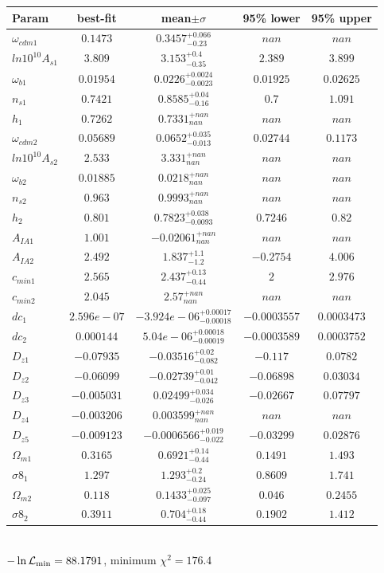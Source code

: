 \begin{tabular}{|l|c|c|c|c|} 
 \hline 
Param & best-fit & mean$\pm\sigma$ & 95\% lower & 95\% upper \\ \hline 
$\omega_{cdm 1 }$ &$0.1473$ & $0.3457_{-0.23}^{+0.066}$ & $nan$ & $nan$ \\ 
$ln10^{10}A_{s 1 }$ &$3.809$ & $3.153_{-0.35}^{+0.4}$ & $2.389$ & $3.899$ \\ 
$\omega_{b 1 }$ &$0.01954$ & $0.0226_{-0.0023}^{+0.0024}$ & $0.01925$ & $0.02625$ \\ 
$n_{s 1 }$ &$0.7421$ & $0.8585_{-0.16}^{+0.04}$ & $0.7$ & $1.091$ \\ 
$h_{1 }$ &$0.7262$ & $0.7331_{nan}^{+nan}$ & $nan$ & $nan$ \\ 
$\omega_{cdm 2 }$ &$0.05689$ & $0.0652_{-0.013}^{+0.035}$ & $0.02744$ & $0.1173$ \\ 
$ln10^{10}A_{s 2 }$ &$2.533$ & $3.331_{nan}^{+nan}$ & $nan$ & $nan$ \\ 
$\omega_{b 2 }$ &$0.01885$ & $0.0218_{nan}^{+nan}$ & $nan$ & $nan$ \\ 
$n_{s 2 }$ &$0.963$ & $0.9993_{nan}^{+nan}$ & $nan$ & $nan$ \\ 
$h_{2 }$ &$0.801$ & $0.7823_{-0.0093}^{+0.038}$ & $0.7246$ & $0.82$ \\ 
$A_{IA 1 }$ &$1.001$ & $-0.02061_{nan}^{+nan}$ & $nan$ & $nan$ \\ 
$A_{IA 2 }$ &$2.492$ & $1.837_{-1.2}^{+1.1}$ & $-0.2754$ & $4.006$ \\ 
$c_{min 1 }$ &$2.565$ & $2.437_{-0.44}^{+0.13}$ & $2$ & $2.976$ \\ 
$c_{min 2 }$ &$2.045$ & $2.57_{nan}^{+nan}$ & $nan$ & $nan$ \\ 
$dc_{1 }$ &$2.596e-07$ & $-3.924e-06_{-0.00018}^{+0.00017}$ & $-0.0003557$ & $0.0003473$ \\ 
$dc_{2 }$ &$0.000144$ & $5.04e-06_{-0.00019}^{+0.00018}$ & $-0.0003589$ & $0.0003752$ \\ 
$D_{z1 }$ &$-0.07935$ & $-0.03516_{-0.082}^{+0.02}$ & $-0.117$ & $0.0782$ \\ 
$D_{z2 }$ &$-0.06099$ & $-0.02739_{-0.042}^{+0.01}$ & $-0.06898$ & $0.03034$ \\ 
$D_{z3 }$ &$-0.005031$ & $0.02499_{-0.026}^{+0.034}$ & $-0.02667$ & $0.07797$ \\ 
$D_{z4 }$ &$-0.003206$ & $0.003599_{nan}^{+nan}$ & $nan$ & $nan$ \\ 
$D_{z5 }$ &$-0.009123$ & $-0.0006566_{-0.022}^{+0.019}$ & $-0.03299$ & $0.02876$ \\ 
$\Omega_{m 1 }$ &$0.3165$ & $0.6921_{-0.44}^{+0.14}$ & $0.1491$ & $1.493$ \\ 
$\sigma8_{1 }$ &$1.297$ & $1.293_{-0.24}^{+0.2}$ & $0.8609$ & $1.741$ \\ 
$\Omega_{m 2 }$ &$0.118$ & $0.1433_{-0.097}^{+0.025}$ & $0.046$ & $0.2455$ \\ 
$\sigma8_{2 }$ &$0.3911$ & $0.704_{-0.44}^{+0.18}$ & $0.1902$ & $1.412$ \\ 
\hline 
 \end{tabular} \\ 
$-\ln{\cal L}_\mathrm{min} =88.1791$, minimum $\chi^2=176.4$ \\ 
